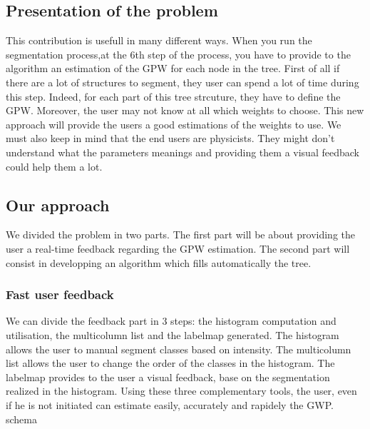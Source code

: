 \subsection{Presentation of the problem}
This contribution is usefull in many different ways.
When you run the segmentation process,at the 6th step of the process, you have to provide to the algorithm an estimation of the GPW for each node in the tree. 
First of all if there are a lot of structures to segment, they user can spend a lot of time during this step. Indeed, for each part of this tree strcuture, they have to define the GPW. Moreover, the user may not know at all which weights to choose. This new approach will provide the users a good estimations of the weights to use. We must also keep in mind that the end users are physicists. They might don't understand what the parameters meanings and providing them a visual feedback could help them a lot.
\subsection{Our approach}
We divided the problem in two parts. The first part will be about providing the user a real-time feedback regarding the GPW estimation.
The second part will consist in developping an algorithm which fills automatically the tree.
\subsubsection{Fast user feedback}
We can divide the feedback part in 3 steps: the histogram computation and utilisation, the multicolumn list and the labelmap generated.
The histogram allows the user to manual segment classes based on intensity.
The multicolumn list allows the user to change the order of the classes in the histogram.
The labelmap provides to the user a visual feedback, base on the segmentation realized in the histogram.
Using these three complementary tools, the user, even if he is not initiated can estimate easily, accurately and rapidely the GWP.
\\schema
